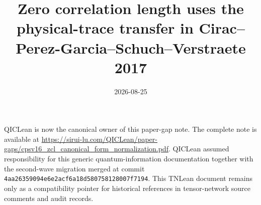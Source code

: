 \documentclass{article}
\title{Zero correlation length uses the physical-trace transfer in Cirac--Perez-Garcia--Schuch--Verstraete 2017}
\author{}
\date{2026-08-25}
\begin{document}
\maketitle
{}

QICLean is now the canonical owner of this paper-gap note. The complete note is
available at
\url{https://sirui-lu.com/QICLean/paper-gaps/cpsv16_zcl_canonical_form_normalization.pdf}.
QICLean assumed responsibility for this generic quantum-information
documentation together with the second-wave migration merged at commit
\texttt{4aa26359094e6e2acf6a18d580758128007f7194}. This TNLean document remains
only as a compatibility pointer for historical references in tensor-network
source comments and audit records.
\end{document}
